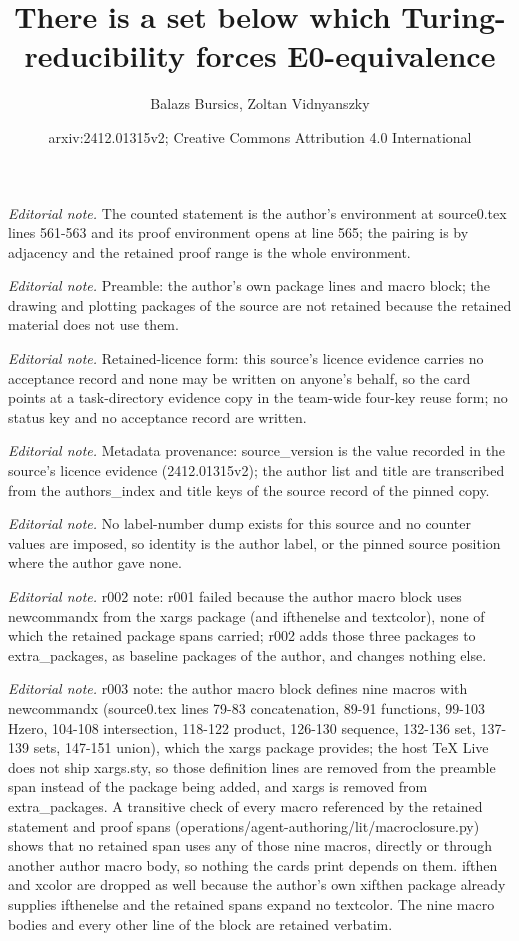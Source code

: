 \documentclass[10pt,a4paper]{article}
\title{There is a set below which Turing-reducibility forces E0-equivalence}
\author{Balazs Bursics, Zoltan Vidnyanszky}
\date{arxiv:2412.01315v2; Creative Commons Attribution 4.0 International}
\theoremstyle{definition}
\numberwithin{equation}{section}
\begin{document}
\maketitle
\noindent\textit{Editorial note.} The counted statement is the author's environment at source0.tex lines 561-563 and its proof environment opens at line 565; the pairing is by adjacency and the retained proof range is the whole environment.\par\medskip
\noindent\textit{Editorial note.} Preamble: the author's own package lines and macro block; the drawing and plotting packages of the source are not retained because the retained material does not use them.\par\medskip
\noindent\textit{Editorial note.} Retained-licence form: this source's licence evidence carries no acceptance record and none may be written on anyone's behalf, so the card points at a task-directory evidence copy in the team-wide four-key reuse form; no status key and no acceptance record are written.\par\medskip
\noindent\textit{Editorial note.} Metadata provenance: source\_version is the value recorded in the source's licence evidence (2412.01315v2); the author list and title are transcribed from the authors\_index and title keys of the source record of the pinned copy.\par\medskip
\noindent\textit{Editorial note.} No label-number dump exists for this source and no counter values are imposed, so identity is the author label, or the pinned source position where the author gave none.\par\medskip
\noindent\textit{Editorial note.} r002 note: r001 failed because the author macro block uses newcommandx from the xargs package (and ifthenelse and textcolor), none of which the retained package spans carried; r002 adds those three packages to extra\_packages, as baseline packages of the author, and changes nothing else.\par\medskip
\noindent\textit{Editorial note.} r003 note: the author macro block defines nine macros with newcommandx (source0.tex lines 79-83 concatenation, 89-91 functions, 99-103 Hzero, 104-108 intersection, 118-122 product, 126-130 sequence, 132-136 set, 137-139 sets, 147-151 union), which the xargs package provides; the host TeX Live does not ship xargs.sty, so those definition lines are removed from the preamble span instead of the package being added, and xargs is removed from extra\_packages. A transitive check of every macro referenced by the retained statement and proof spans (operations/agent-authoring/lit/macroclosure.py) shows that no retained span uses any of those nine macros, directly or through another author macro body, so nothing the cards print depends on them. ifthen and xcolor are dropped as well because the author's own xifthen package already supplies ifthenelse and the retained spans expand no textcolor. The nine macro bodies and every other line of the block are retained verbatim.\par\medskip
\end{document}
